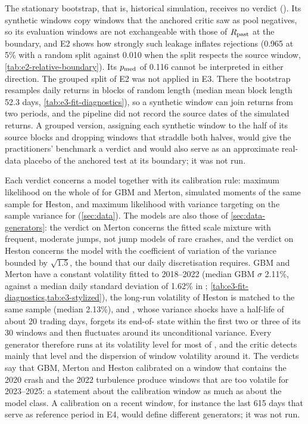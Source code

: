 The stationary bootstrap, that is, historical simulation, receives no verdict
(\INVALID{}). Its synthetic windows copy \TRAIN{} windows that the anchored critic saw as pool
negatives, so its evaluation windows are not exchangeable with those of $R_{\mathrm{past}}$ at the boundary,
and E2 shows how strongly such leakage inflates rejections (0.965 at 5\% with a random split
against 0.010 when the split respects the source window, \cref{tab:e2-relative-boundary}). Its
$p_{\mathrm{med}}$ of 0.116 cannot be interpreted in either direction. The grouped split of E2 was not
applied in E3. There the bootstrap resamples daily returns in blocks of random length (median
mean block length 52.3 days, \cref{tab:e3-fit-diagnostics}), so a synthetic window can join
returns from two \TRAIN{} periods, and the pipeline did not record the source dates of the
simulated returns. A grouped version, assigning each synthetic window to the half of its source
\TRAIN{} blocks and dropping windows that straddle both halves, would give the practitioners'
benchmark a verdict and would also serve as an approximate real-data placebo of the anchored test
at its boundary; it was not run.

Each verdict concerns a model together with its calibration rule: maximum likelihood on the
whole of \TRAIN{} for GBM and Merton, simulated moments of the same sample for Heston, and
maximum likelihood with variance targeting on the \TRAIN{} sample variance for \GARCHt{}
(\cref{sec:data}). The models are also those of \cref{sec:data-generators}: the verdict on Merton
concerns the fitted scale mixture with frequent, moderate jumps, not jump models of rare crashes,
and the verdict on Heston concerns the model with the coefficient of variation of the variance
bounded by $\sqrt{1.5}$, the bound that our daily discretisation requires. GBM and Merton have a
constant volatility fitted to 2018--2022 (median GBM
$\sigma$ 2.11\%, against a median daily standard deviation of 1.62\% in \TEST{};
\cref{tab:e3-fit-diagnostics,tab:e3-stylized}), the long-run volatility of Heston is matched to
the same sample (median 2.13\%), and \GARCHt{}, whose variance shocks have a half-life of about
20 trading days, forgets its end-of-\TRAIN{} state within the first two or three of its 30
\TEST{} windows and then fluctuates around its \TRAIN{} unconditional variance.
Every generator therefore runs at its \TRAIN{} volatility level for most of \TEST{}, and the
critic detects mainly that level and the dispersion of window volatility around it. The \BAD{}
verdicts say that GBM, Merton and Heston calibrated on a window that contains the 2020 crash and
the 2022 turbulence produce windows that are too volatile for 2023--2025: a statement about the
calibration window as much as about the model class. A calibration on a recent window, for
instance the last 615 \TRAIN{} days that serve as reference period in E4, would define different
generators; it was not run.

